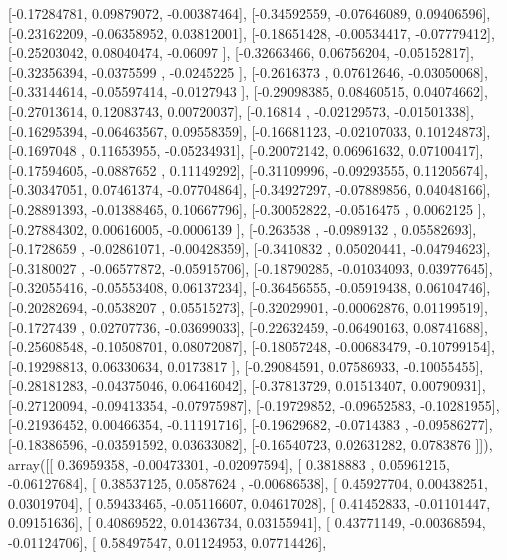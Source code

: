 \documentclass{article}
\begin{document}
       [-0.17284781,  0.09879072, -0.00387464],
       [-0.34592559, -0.07646089,  0.09406596],
       [-0.23162209, -0.06358952,  0.03812001],
       [-0.18651428, -0.00534417, -0.07779412],
       [-0.25203042,  0.08040474, -0.06097   ],
       [-0.32663466,  0.06756204, -0.05152817],
       [-0.32356394, -0.0375599 , -0.0245225 ],
       [-0.2616373 ,  0.07612646, -0.03050068],
       [-0.33144614, -0.05597414, -0.0127943 ],
       [-0.29098385,  0.08460515,  0.04074662],
       [-0.27013614,  0.12083743,  0.00720037],
       [-0.16814   , -0.02129573, -0.01501338],
       [-0.16295394, -0.06463567,  0.09558359],
       [-0.16681123, -0.02107033,  0.10124873],
       [-0.1697048 ,  0.11653955, -0.05234931],
       [-0.20072142,  0.06961632,  0.07100417],
       [-0.17594605, -0.0887652 ,  0.11149292],
       [-0.31109996, -0.09293555,  0.11205674],
       [-0.30347051,  0.07461374, -0.07704864],
       [-0.34927297, -0.07889856,  0.04048166],
       [-0.28891393, -0.01388465,  0.10667796],
       [-0.30052822, -0.0516475 ,  0.0062125 ],
       [-0.27884302,  0.00616005, -0.0006139 ],
       [-0.263538  , -0.0989132 ,  0.05582693],
       [-0.1728659 , -0.02861071, -0.00428359],
       [-0.3410832 ,  0.05020441, -0.04794623],
       [-0.3180027 , -0.06577872, -0.05915706],
       [-0.18790285, -0.01034093,  0.03977645],
       [-0.32055416, -0.05553408,  0.06137234],
       [-0.36456555, -0.05919438,  0.06104746],
       [-0.20282694, -0.0538207 ,  0.05515273],
       [-0.32029901, -0.00062876,  0.01199519],
       [-0.1727439 ,  0.02707736, -0.03699033],
       [-0.22632459, -0.06490163,  0.08741688],
       [-0.25608548, -0.10508701,  0.08072087],
       [-0.18057248, -0.00683479, -0.10799154],
       [-0.19298813,  0.06330634,  0.0173817 ],
       [-0.29084591,  0.07586933, -0.10055455],
       [-0.28181283, -0.04375046,  0.06416042],
       [-0.37813729,  0.01513407,  0.00790931],
       [-0.27120094, -0.09413354, -0.07975987],
       [-0.19729852, -0.09652583, -0.10281955],
       [-0.21936452,  0.00466354, -0.11191716],
       [-0.19629682, -0.0714383 , -0.09586277],
       [-0.18386596, -0.03591592,  0.03633082],
       [-0.16540723,  0.02631282,  0.0783876 ]]), array([[ 0.36959358, -0.00473301, -0.02097594],
       [ 0.3818883 ,  0.05961215, -0.06127684],
       [ 0.38537125,  0.0587624 , -0.00686538],
       [ 0.45927704,  0.00438251,  0.03019704],
       [ 0.59433465, -0.05116607,  0.04617028],
       [ 0.41452833, -0.01101447,  0.09151636],
       [ 0.40869522,  0.01436734,  0.03155941],
       [ 0.43771149, -0.00368594, -0.01124706],
       [ 0.58497547,  0.01124953,  0.07714426],
\end{document}
